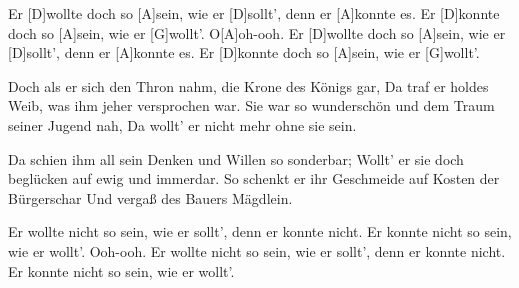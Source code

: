 \begin{guitar}
	\begin{highlightbar}
		 
		Er [D]wollte doch so [A]sein, wie er [D]sollt', denn er [A]konnte es.
		Er [D]konnte doch so [A]sein, wie er [G]wollt'. O[A]oh-ooh.
		Er [D]wollte doch so [A]sein, wie er [D]sollt', denn er [A]konnte es.
		Er [D]konnte doch so [A]sein, wie er [G]wollt'.
	\end{highlightbar}
	
	\songsection{Strophe 4}
	Doch als er sich den Thron nahm, die Krone des Königs gar,
	Da traf er holdes Weib, was ihm jeher versprochen war.
	Sie war so wunderschön und dem Traum seiner Jugend nah,
	Da wollt' er nicht mehr ohne sie sein.
	
	Da schien ihm all sein Denken und Willen so sonderbar;
	Wollt' er sie doch beglücken auf ewig und immerdar.
	So schenkt er ihr Geschmeide auf Kosten der Bürgerschar
	Und vergaß des Bauers Mägdlein.
	
	\begin{highlightbar}
		 \optionalChord{(x2)}
		Er wollte nicht so sein, wie er sollt', denn er konnte nicht.
		Er konnte nicht so sein, wie er wollt'. Ooh-ooh.
		Er wollte nicht so sein, wie er sollt', denn er konnte nicht.
		Er konnte nicht so sein, wie er wollt'.
	\end{highlightbar}
	
\end{guitar}

